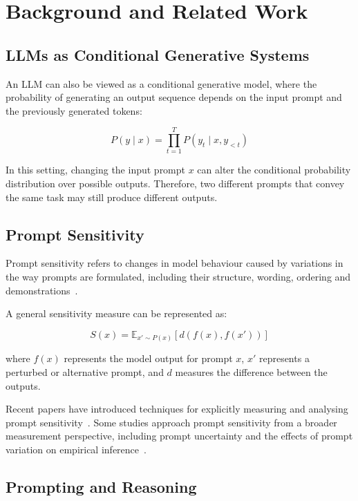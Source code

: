 \documentclass[acmsmall,screen,review]{acmart}
\begin{document}
\section{Background and Related Work}
\label{sec:background}

\subsection{LLMs as Conditional Generative Systems}

An LLM can also be viewed as a conditional generative model, where the probability of generating an output sequence depends on the input prompt and the previously generated tokens:

\begin{equation}
P(y\mid x)=\prod_{t=1}^{T}P(y_t\mid x,y_{<t})
\label{eq:autoregressive}
\end{equation}

In this setting, changing the input prompt $x$ can alter the conditional probability distribution over possible outputs. Therefore, two different prompts that convey the same task may still produce different outputs.

\subsection{Prompt Sensitivity}

Prompt sensitivity refers to changes in model behaviour caused by variations in the way prompts are formulated, including their structure, wording, ordering and demonstrations~\cite{lu2022,zhuo2024,errica2025}.

A general sensitivity measure can be represented as:

\begin{equation}
S(x)=\mathbb{E}_{x'\sim P(x)}[d(f(x),f(x'))]
\label{eq:sensitivity}
\end{equation}

where $f(x)$ represents the model output for prompt $x$, $x'$ represents a perturbed or alternative prompt, and $d$ measures the difference between the outputs.

Recent papers have introduced techniques for explicitly measuring and analysing prompt sensitivity~\cite{zhuo2024,qin2026}. Some studies approach prompt sensitivity from a broader measurement perspective, including prompt uncertainty and the effects of prompt variation on empirical inference~\cite{leng2026,liu_chu2026}.

\subsection{Prompting and Reasoning}
\end{document}
